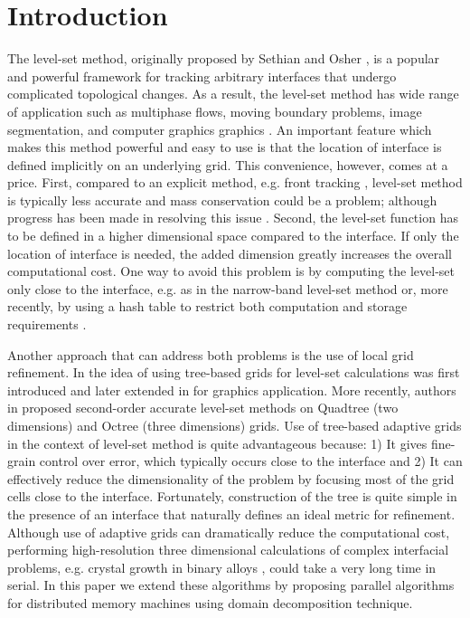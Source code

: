 \section{Introduction}\label{sec:introduction}
The level-set method, originally proposed by Sethian and Osher \cite{Osher;Sethian:88:Fronts-Propagating-w}, is a popular and powerful framework for tracking arbitrary interfaces that undergo complicated topological changes. As a result, the level-set method has wide range of application such as multiphase flows, moving boundary problems, image segmentation, and computer graphics graphics \cite{Osher;Fedkiw:01:Level-Set-Methods:-A,Sethian:99:Level-set-methods-an}. An important feature which makes this method powerful and easy to use is that the location of interface is defined implicitly on an underlying grid. This convenience, however, comes at a price. First, compared to an explicit method, e.g. front tracking \cite{Juric:96:A-Front-Tracking-Met, Tryggvason;Bunner;Esmaeeli;etal:01:A-Front-Tracking-Met}, level-set method is typically less accurate and mass conservation could be a problem; although progress has been made in resolving this issue \cite{Enright;Fedkiw;Ferziger;etal:02:A-Hybrid-Particle-Le}. Second, the level-set function has to be defined in a higher dimensional space compared to the interface. If only the location of interface is needed, the added dimension greatly increases the overall computational cost. One way to avoid this problem is by computing the level-set only close to the interface, e.g. as in the narrow-band level-set method \cite{Adalsteinsson;Sethian:95:A-Fast-Level-Set-Met} or, more recently, by using a hash table to restrict both computation and storage requirements \cite{Brun;Guittet;Gibou:12:A-local-level-set-me}.

Another approach that can address both problems is the use of local grid refinement. In \cite{Strain:99:Tree-Methods-for-Mov} the idea of using tree-based grids for level-set calculations was first introduced and later extended in \cite{Losasso;Gibou;Fedkiw:04:Simulating-Water-and} for graphics application. More recently, authors in \cite{Min;Gibou:07:A-second-order-accur} proposed second-order accurate level-set methods on Quadtree (two dimensions) and Octree (three dimensions) grids. Use of tree-based adaptive grids in the context of level-set method is quite advantageous because: 1) It gives fine-grain control over error, which typically occurs close to the interface and 2) It can effectively reduce the dimensionality of the problem by focusing most of the grid cells close to the interface. Fortunately, construction of the tree is quite simple in the presence of an interface that naturally defines an ideal metric for refinement. Although use of adaptive grids can dramatically reduce the computational cost, performing high-resolution three dimensional calculations of complex interfacial problems, e.g. crystal growth in binary alloys \cite{Theillard;Gibou;Pollock:14:A-Sharp-Computationa}, could take a very long time in serial. In this paper we extend these algorithms by proposing parallel algorithms for distributed memory machines using domain decomposition technique.

